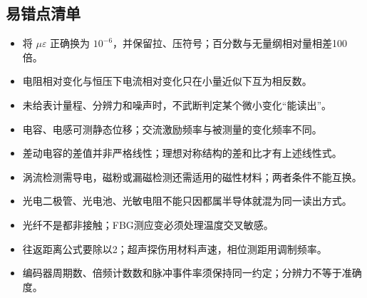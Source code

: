 \subsection*{易错点清单}
\begin{itemize}
\item 将 $\mu\varepsilon$ 正确换为 $10^{-6}$，并保留拉、压符号；百分数与无量纲相对量相差100倍。
\item 电阻相对变化与恒压下电流相对变化只在小量近似下互为相反数。
\item 未给表计量程、分辨力和噪声时，不武断判定某个微小变化“能读出”。
\item 电容、电感可测静态位移；交流激励频率与被测量的变化频率不同。
\item 差动电容的差值并非严格线性；理想对称结构的差和比才有上述线性式。
\item 涡流检测需导电，磁粉或漏磁检测还需适用的磁性材料；两者条件不能互换。
\item 光电二极管、光电池、光敏电阻不能只因都属半导体就混为同一读出方式。
\item 光纤不是都非接触；FBG测应变必须处理温度交叉敏感。
\item 往返距离公式要除以2；超声探伤用材料声速，相位测距用调制频率。
\item 编码器周期数、倍频计数数和脉冲事件率须保持同一约定；分辨力不等于准确度。
\end{itemize}

